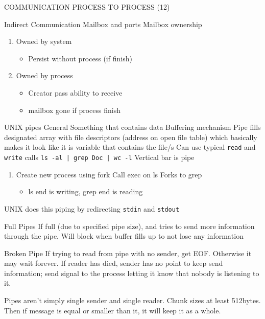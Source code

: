 \documentclass{article}
\newcommand\tab[1][0.5cm]{\hspace*{#1}}
\begin{document}
			COMMUNICATION PROCESS TO PROCESS (12)

			Indirect Communication
				Mailbox and ports
					Mailbox ownership
					\begin{enumerate}
						\item Owned by system
						\begin{itemize}
							\item Persist without process (if finish)
						\end{itemize}
						\item Owned by process
						\begin{itemize}
							\item Creator pass ability to receive
							\item mailbox gone if process finish
						\end{itemize}
					\end{enumerate}

	UNIX pipes
		General
			Something that contains data
			Buffering mechanism
			Pipe fills designated array with file descriptors (address on open file table) which basically makes it look like it is variable that contains the file/s
			Can use typical \texttt{read} and \texttt{write} calls
			\texttt{ls -al | grep Doc | wc -l} \tab Vertical bar is pipe

			\begin{enumerate}
				\item Create new process using fork
				Call exec on ls
				Forks to grep
				\begin{itemize}
					\item ls end is writing, grep end is reading
				\end{itemize}
			\end{enumerate}

			UNIX does this piping by redirecting \texttt{stdin} and \texttt{stdout}

		Full Pipes
			If full (due to specified pipe size), and tries to send more information through the pipe. Will block when buffer fills up to not lose any information

		Broken Pipe
			If trying to read from pipe with no sender, get EOF. Otherwise it may wait forever.
			If reader has died, sender has no point to keep send information; send signal to the process letting it know that nobody is listening to it.

			Pipes aren't simply single sender and single reader.
			Chunk sizes at least 512bytes. Then if message is equal or smaller than it, it will keep it as a whole.
\end{document}
